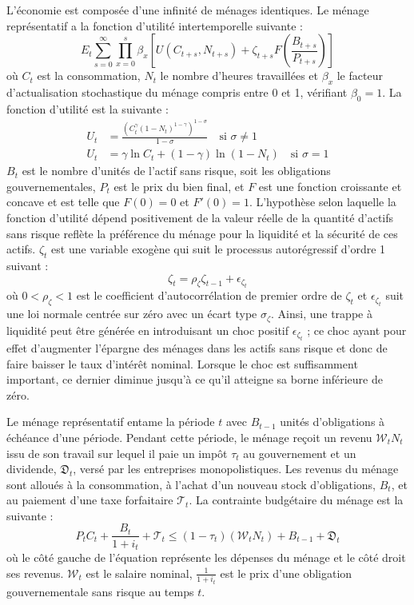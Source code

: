 \documentclass[12pt,letterpaper]{article}
\newcommand{\Et}{E_t}
\newcommand{\WW}{\mathcal{W}}
\newcommand{\TT}{\mathcal{T}}
\newcommand{\DD}{\mathfrak{D}}
\begin{document}
L’économie est composée d’une infinité de ménages identiques. Le ménage représentatif a la fonction d’utilité intertemporelle suivante :
\begin{equation}
\Et \sum_{s=0}^{\infty} \prod_{x=0}^{s} \beta_x \left[ U(C_{t+s}, N_{t+s}) + \zeta_{t+s} F\!\left(\frac{B_{t+s}}{P_{t+s}}\right) \right] \tag{1}
\end{equation}
où $C_t$ est la consommation, $N_t$ le nombre d’heures travaillées et $\beta_x$ le facteur d’actualisation stochastique du ménage compris entre 0 et 1, vérifiant $\beta_0 = 1$. La fonction d’utilité est la suivante :
\begin{align}
U_t &= \frac{\left(C_t^{\gamma}(1-N_t)^{1-\gamma}\right)^{1-\sigma}}{1-\sigma} \quad \text{si } \sigma \neq 1 \tag{2}\\
U_t &= \gamma \ln C_t + (1-\gamma)\ln(1-N_t) \quad \text{si } \sigma = 1 \tag{3}
\end{align}
$B_t$ est le nombre d’unités de l’actif sans risque, soit les obligations gouvernementales, $P_t$ est le prix du bien final, et $F$ est une fonction croissante et concave et est telle que $F(0)=0$ et $F'(0)=1$. L’hypothèse selon laquelle la fonction d’utilité dépend positivement de la valeur réelle de la quantité d’actifs sans risque reflète la préférence du ménage pour la liquidité et la sécurité de ces actifs. $\zeta_t$ est une variable exogène qui suit le processus autorégressif d’ordre 1 suivant :
\begin{equation}
\zeta_t = \rho_\zeta \zeta_{t-1} + \epsilon_{\zeta_t} \tag{4}
\end{equation}
où $0 < \rho_\zeta < 1$ est le coefficient d’autocorrélation de premier ordre de $\zeta_t$ et $\epsilon_{\zeta_t}$ suit une loi normale centrée sur zéro avec un écart type $\sigma_\zeta$. Ainsi, une trappe à liquidité peut être générée en introduisant un choc positif $\epsilon_{\zeta_t}$ ; ce choc ayant pour effet d’augmenter l’épargne des ménages dans les actifs sans risque et donc de faire baisser le taux d’intérêt nominal. Lorsque le choc est suffisamment important, ce dernier diminue jusqu’à ce qu’il atteigne sa borne inférieure de zéro.

Le ménage représentatif entame la période $t$ avec $B_{t-1}$ unités d’obligations à échéance d’une période. Pendant cette période, le ménage reçoit un revenu $\WW_t N_t$ issu de son travail sur lequel il paie un impôt $\tau_t$ au gouvernement et un dividende, $\DD_t$, versé par les entreprises monopolistiques. Les revenus du ménage sont alloués à la consommation, à l’achat d’un nouveau stock d’obligations, $B_t$, et au paiement d’une taxe forfaitaire $\TT_t$. La contrainte budgétaire du ménage est la suivante :
\begin{equation}
P_t C_t + \frac{B_t}{1+i_t} + \TT_t \leq (1-\tau_t)(\WW_t N_t) + B_{t-1} + \DD_t \tag{5}
\end{equation}
où le côté gauche de l’équation représente les dépenses du ménage et le côté droit ses revenus. $\WW_t$ est le salaire nominal, $\frac{1}{1+i_t}$ est le prix d’une obligation gouvernementale sans risque au temps $t$.
\end{document}
